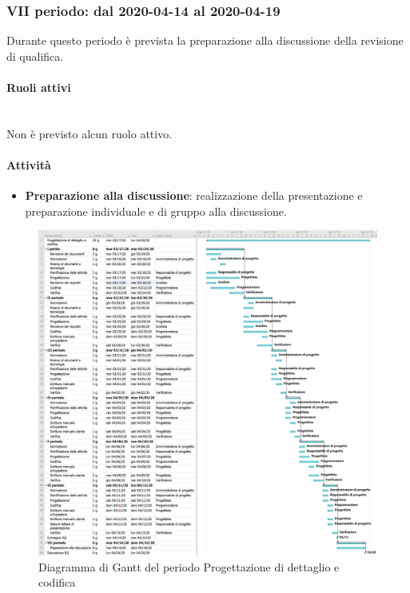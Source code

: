 \subsubsection{VII periodo: dal 2020-04-14 al 2020-04-19}
Durante questo periodo è prevista la preparazione alla discussione della revisione di qualifica.
\paragraph{Ruoli attivi} \mbox{}\\ [1mm]
Non è previsto alcun ruolo attivo.
\paragraph{Attività}
\begin{itemize}
	\item \textbf{Preparazione alla discussione}: realizzazione della presentazione e preparazione individuale e di gruppo alla discussione.
\end{itemize}
\begin{landscape}
	\begin{figure}
		\includegraphics[width=160mm]{./gantt/Progettazione di dettaglio e codifica.png}
		\caption{Diagramma di Gantt del periodo Progettazione di dettaglio e codifica}
	\end{figure}
\end{landscape}
\pagebreak

